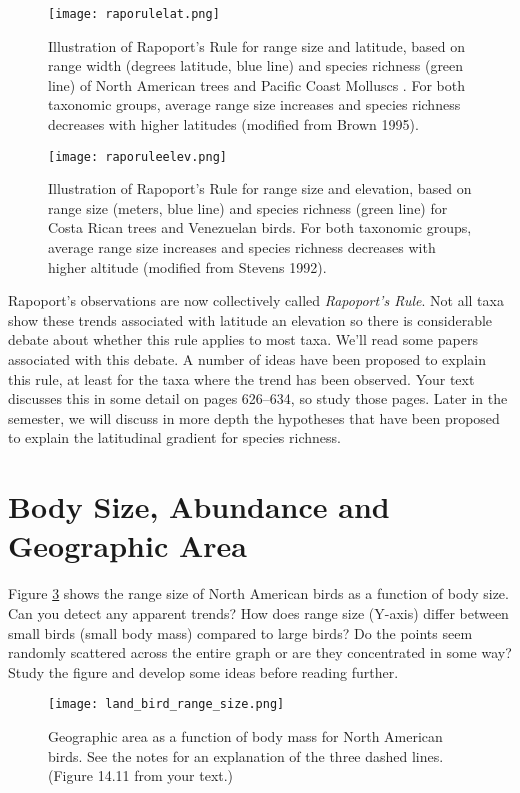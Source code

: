 \documentclass[11pt, hidelinks]{article}
\begin{document}
\begin{figure}
	\centering
		\texttt{[image: raporulelat.png]}  
		\caption{Illustration of Rapoport's Rule for range size and latitude, based on range width (degrees latitude, blue line) and species richness (green line) of North American trees and Pacific Coast Molluscs . For both taxonomic groups, average range size increases and species richness decreases with higher latitudes (modified from Brown 1995).\label{raporulelat}}
		
\end{figure}

\begin{figure}
	\centering
		\texttt{[image: raporuleelev.png]}  
		\caption{Illustration of Rapoport's Rule for range size and elevation, based on range size (meters, blue line) and species richness (green line) for Costa Rican trees and Venezuelan birds. For both taxonomic groups, average range size increases and species richness decreases with higher altitude (modified from Stevens 1992).\label{raporuleelev}}
\end{figure}

Rapoport's observations are now collectively called \emph{Rapoport's Rule}.  Not all taxa show these trends associated with latitude an elevation so there is considerable debate about whether this rule applies to most taxa. We'll read some papers associated with this debate.  A number of ideas have been proposed to explain this rule, at least for the taxa where the trend has been observed.  Your text discusses this in some detail on pages 626--634, so study those pages.  Later in the semester, we will discuss in more depth the hypotheses that have been proposed to explain the latitudinal gradient for species richness.

\section{Body Size, Abundance and Geographic Area}

Figure \ref{areabodysize}  shows the range size of North American birds as a function of body size.  Can you detect any apparent trends? How does range size (Y-axis) differ between small birds (small body mass) compared to large birds? Do the points seem randomly scattered across the entire graph or are they concentrated in some way?  Study the figure and develop some ideas before reading further.

\begin{figure}[tb]
	\centering
		\texttt{[image: land\_bird\_range\_size.png]}
		\caption{Geographic area as a function of body mass for North American birds.  See the notes for an explanation of the three dashed lines. (Figure 14.11 from your text.)\label{areabodysize}}
\end{figure}
\end{document}
